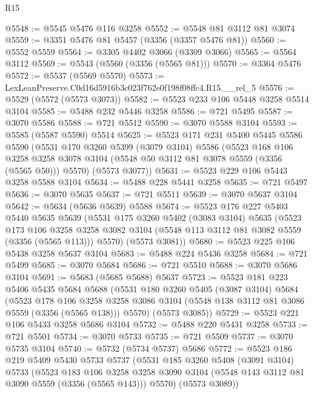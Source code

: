 \begin{lexlean}{R15}
\begin{coremodule}
@5548 := @5545 @5476 @116 @3258
@5552 := @5548 @81 @3112 @81 @3074
@5559 := @3351 @5476 @81 @5457 (@3356 (@3357 @5476 @81))
@5560 := @5552 @5559
@5564 := @3305 @4402 @3066 (@3309 @3066)
@5565 := @5564 @3112
@5569 := @5543 (@5560 (@3356 (@5565 @81)))
@5570 := @3364 @5476
@5572 := @5537 (@5569 @5570)
@5573 := LexLeanPreserve.C0d16d5916b3c023f762e0f198f08ffc4.R15.__rel_5
@5576 := @5529 (@5572 (@5573 @3073))
@5582 := @5523 @233 @106 @5448 @3258 @5514 @3104
@5585 := @5488 @232 @5446 @3258
@5586 := @721 @5495
@5587 := @3070 @5586
@5588 := @721 @5512
@5590 := @3070 @5588 @3104
@5593 := @5585 (@5587 @5590) @5514
@5625 := @5523
    @171
    @231
    @5400
    @5445
    @5586
    @5590
    (@5531
      @170
      @3260
      @5399
      (@3079 @3104)
      @5586
      (@5523
        @168
        @106
        @3258
        @3258
        @3078
        @3104
        (@5548 @50 @3112 @81 @3078 @5559 (@3356 (@5565 @50)))
        @5570)
      (@5573 @3077))
@5631 := @5523 @229 @106 @5443 @3258 @5588 @3104
@5634 := @5488 @228 @5441 @3258
@5635 := @721 @5497
@5636 := @3070 @5635
@5637 := @721 @5511
@5639 := @3070 @5637 @3104
@5642 := @5634 (@5636 @5639) @5588
@5674 := @5523
    @176
    @227
    @5403
    @5440
    @5635
    @5639
    (@5531
      @175
      @3260
      @5402
      (@3083 @3104)
      @5635
      (@5523
        @173
        @106
        @3258
        @3258
        @3082
        @3104
        (@5548 @113 @3112 @81 @3082 @5559 (@3356 (@5565 @113)))
        @5570)
      (@5573 @3081))
@5680 := @5523 @225 @106 @5438 @3258 @5637 @3104
@5683 := @5488 @224 @5436 @3258
@5684 := @721 @5499
@5685 := @3070 @5684
@5686 := @721 @5510
@5688 := @3070 @5686 @3104
@5691 := @5683 (@5685 @5688) @5637
@5723 := @5523
    @181
    @223
    @5406
    @5435
    @5684
    @5688
    (@5531
      @180
      @3260
      @5405
      (@3087 @3104)
      @5684
      (@5523
        @178
        @106
        @3258
        @3258
        @3086
        @3104
        (@5548 @138 @3112 @81 @3086 @5559 (@3356 (@5565 @138)))
        @5570)
      (@5573 @3085))
@5729 := @5523 @221 @106 @5433 @3258 @5686 @3104
@5732 := @5488 @220 @5431 @3258
@5733 := @721 @5501
@5734 := @3070 @5733
@5735 := @721 @5509
@5737 := @3070 @5735 @3104
@5740 := @5732 (@5734 @5737) @5686
@5772 := @5523
    @186
    @219
    @5409
    @5430
    @5733
    @5737
    (@5531
      @185
      @3260
      @5408
      (@3091 @3104)
      @5733
      (@5523
        @183
        @106
        @3258
        @3258
        @3090
        @3104
        (@5548 @143 @3112 @81 @3090 @5559 (@3356 (@5565 @143)))
        @5570)
      (@5573 @3089))

\end{coremodule}
\end{lexlean}
